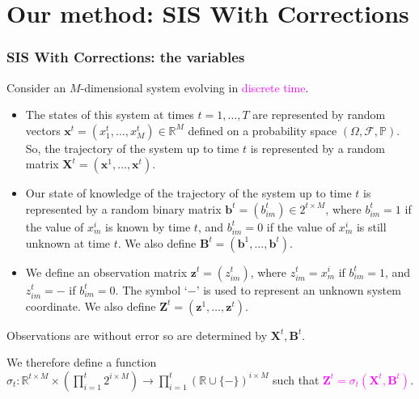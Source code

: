 \documentclass[9pt, xcolor={dvipsnames,svgnames,table}]{beamer}
\newcommand{\F}{\mathcal{F}}
\renewcommand{\P}{\mathbb{P}}
\newcommand{\Real}{\mathbb R}
\begin{document}
\section{Our method: SIS With Corrections}

\begin{frame}
    \frametitle{SIS With Corrections: the variables}
    Consider an $M$-dimensional system evolving in \textcolor{Fuchsia}{discrete time}.
    \begin{itemize}
        \item The \textcolor{PineGreen}{states of this system} at times $t = 1, \dots, T$ are represented by random vectors $\bm{x}^t = (x^t_1, \dots, x^t_M) \in \Real^M$ defined on a probability space $(\Omega, \F, \P)$. So, the \textcolor{PineGreen}{trajectory of the system} up to time $t$ is represented by a random matrix $\bm{X}^t = (\bm{x}^1, \ldots, \bm{x}^t)$. 
        \item Our \textcolor{PineGreen}{state of knowledge of the trajectory} of the system up to time $t$ is represented by a random binary matrix $\bm{b}^t = (b^t_{im}) \in 2^{t \times M}$, where $b^t_{im} = 1$ if the value of $x^i_m$ is known by time $t$, and $b^t_{im} = 0$ if the value of $x^i_m$ is still unknown at time $t$. We also define $\bm{B}^t = (\bm{b}^1,\ldots,\bm{b}^t)$.
        \item We define an \textcolor{PineGreen}{observation matrix} $\bm{z}^t = (z^t_{im})$, where $z^t_{im} = x^i_m$ if $b^t_{im} = 1$, and $z^t_{im} = -$ if $b^t_{im} = 0$. The symbol `$-$' is used to represent an unknown system coordinate. We also define $\bm{Z}^t = (\bm{z}^1,\ldots,\bm{z}^t)$.
    \end{itemize}
Observations are without error so are determined by $\bm{X}^t, \bm{B}^t$. 

We therefore define a function $\sigma_t: \Real^{t \times M} \times \left( \prod_{i=1}^t 2^{i \times M} \right) \rightarrow \prod_{i=1}^t (\Real \cup \{ - \})^{i \times M}$ such that \textcolor{Fuchsia}{$\bm{Z}^t = \sigma_t(\bm{X}^t, \bm{B}^t)$}.
\end{frame}
\end{document}
